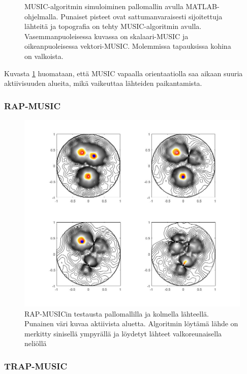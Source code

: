 \begin{figure}[h]
\begin{minipage}{0.45\textwidth}
    \end{minipage}
    \caption{MUSIC-algoritmin simuloiminen pallomallin avulla MATLAB-ohjelmalla. Punaiset pisteet ovat sattumanvaraisesti sijoitettuja lähteitä ja topografia on tehty MUSIC-algoritmin avulla. Vasemmanpuoleisessa kuvassa on skalaari-MUSIC ja oikeanpuoleisessa vektori-MUSIC. Molemmissa tapauksissa kohina on valkoista.}
    \label{fig:MUSIC}
\end{figure}

Kuvasta \ref{fig:MUSIC} huomataan, että MUSIC vapaalla orientaatiolla saa aikaan suuria aktiivisuuden alueita, mikä vaikeuttaa lähteiden paikantamista.

\clearpage
\subsubsection{RAP-MUSIC}
\begin{figure}[h]
    \centering
    \includegraphics[width=1\textwidth]{rap11.jpg}
    \caption{RAP-MUSICin testausta pallomallilla ja kolmella lähteellä. Punainen väri kuvaa aktiivista aluetta. Algoritmin löytämä lähde on merkitty sinisellä ympyrällä ja löydetyt lähteet valkoreunaisella neliöllä}
    \label{fig:RAP}
\end{figure}

\subsubsection{TRAP-MUSIC}